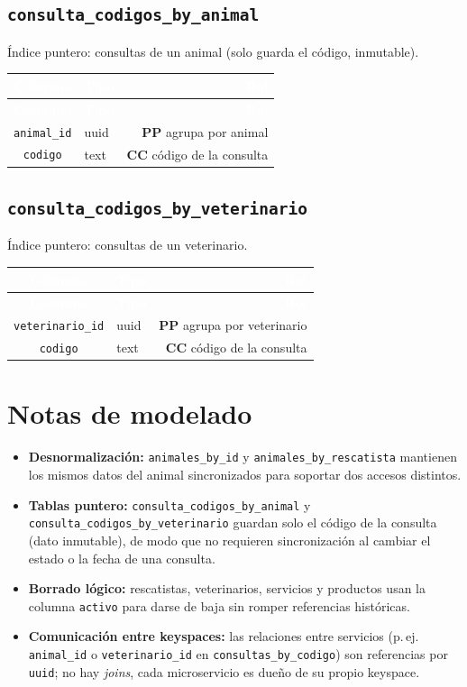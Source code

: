 \documentclass[11pt,a4paper]{article}
\newcommand{\cabecera}{%
  \rowcolor{moss}\textcolor{white}{\textbf{Columna}} &
  \textcolor{white}{\textbf{Tipo}} &
  \textcolor{white}{\textbf{Rol}} \\
}
\begin{document}
\subsection{\texttt{consulta\_codigos\_by\_animal}}
Índice puntero: consultas de un animal (solo guarda el código, inmutable).

\begin{longtable}{C T R}
\cabecera
\endfirsthead
\cabecera
\endhead
\texttt{animal\_id} & uuid & \textbf{PP} \textemdash{} agrupa por animal \\
\texttt{codigo} & text & \textbf{CC} \textemdash{} código de la consulta \\
\end{longtable}

\subsection{\texttt{consulta\_codigos\_by\_veterinario}}
Índice puntero: consultas de un veterinario.

\begin{longtable}{C T R}
\cabecera
\endfirsthead
\cabecera
\endhead
\texttt{veterinario\_id} & uuid & \textbf{PP} \textemdash{} agrupa por veterinario \\
\texttt{codigo} & text & \textbf{CC} \textemdash{} código de la consulta \\
\end{longtable}

\section{Notas de modelado}
\begin{itemize}
  \item \textbf{Desnormalización:} \texttt{animales\_by\_id} y
        \texttt{animales\_by\_rescatista} mantienen los mismos datos del animal
        sincronizados para soportar dos accesos distintos.
  \item \textbf{Tablas puntero:} \texttt{consulta\_codigos\_by\_animal} y
        \texttt{consulta\_codigos\_by\_veterinario} guardan solo el código de la
        consulta (dato inmutable), de modo que no requieren sincronización al
        cambiar el estado o la fecha de una consulta.
  \item \textbf{Borrado lógico:} rescatistas, veterinarios, servicios y productos
        usan la columna \texttt{activo} para darse de baja sin romper referencias
        históricas.
  \item \textbf{Comunicación entre keyspaces:} las relaciones entre servicios
        (p.\,ej. \texttt{animal\_id} o \texttt{veterinario\_id} en
        \texttt{consultas\_by\_codigo}) son referencias por \texttt{uuid}; no hay
        \emph{joins}, cada microservicio es dueño de su propio keyspace.
\end{itemize}
\end{document}
